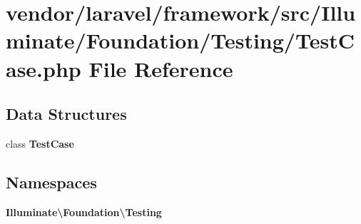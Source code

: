 \section{vendor/laravel/framework/src/\+Illuminate/\+Foundation/\+Testing/\+Test\+Case.php File Reference}
\label{vendor_2laravel_2framework_2src_2_illuminate_2_foundation_2_testing_2_test_case_8php}
\subsection*{Data Structures}
\begin{DoxyCompactItemize}
\item 
class {\bf Test\+Case}
\end{DoxyCompactItemize}
\subsection*{Namespaces}
\begin{DoxyCompactItemize}
\item 
 {\bf Illuminate\textbackslash{}\+Foundation\textbackslash{}\+Testing}
\end{DoxyCompactItemize}
